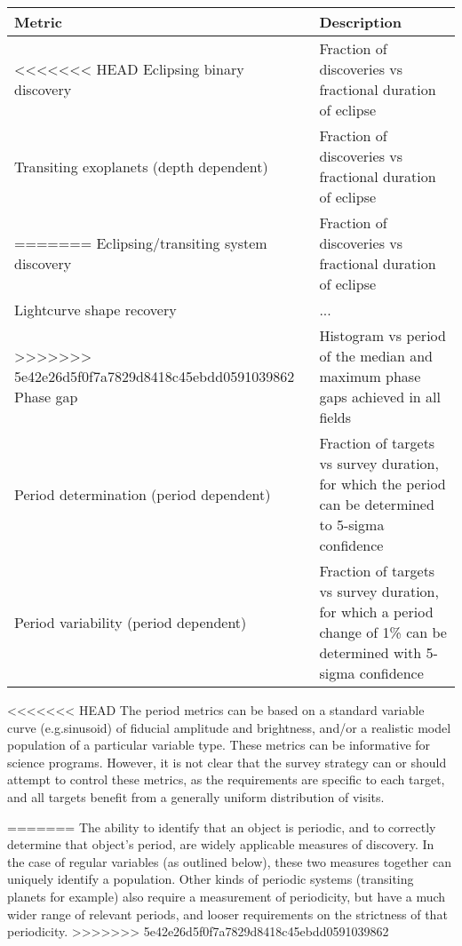 \begin{center}
\begin{tabular}{| p{5cm} |p{10cm} |}
\hline Metric & Description\\
\hline
<<<<<<< HEAD
Eclipsing binary discovery & Fraction of discoveries vs fractional duration of eclipse\\
Transiting exoplanets (depth dependent) & Fraction of discoveries vs fractional duration of eclipse\\
=======
Eclipsing/transiting system discovery & Fraction of discoveries vs fractional duration of eclipse\\
Lightcurve shape recovery & ... \\
>>>>>>> 5e42e26d5f0f7a7829d8418c45ebdd0591039862
Phase gap & Histogram vs period of the median and maximum phase gaps achieved in all fields\\
Period determination (period dependent) & Fraction of targets vs survey duration, for which the period can be determined to 5-sigma confidence\\
Period variability (period dependent) & Fraction of targets vs survey duration, for which a period change of 1\% can be determined with 5-sigma confidence\\
  \hline \end{tabular}
 \end{center}

<<<<<<< HEAD
The period metrics can be based on a standard variable curve (e.g.sinusoid) of fiducial amplitude and brightness, and/or a realistic model population of a particular variable type. These metrics can be informative for science programs.  However, it is not clear that the survey strategy can or should attempt to control these metrics, as the requirements are specific to each target, and all targets benefit from a generally uniform distribution of visits.

=======
The ability to identify that an object is periodic, and to correctly determine that object's period, are widely applicable measures of discovery. In the case of regular variables (as outlined below), these two measures together can uniquely identify a population. Other kinds of periodic systems (transiting planets for example) also require a measurement of periodicity, but have a much wider range of relevant periods, and looser requirements on the strictness of that periodicity. 
>>>>>>> 5e42e26d5f0f7a7829d8418c45ebdd0591039862

